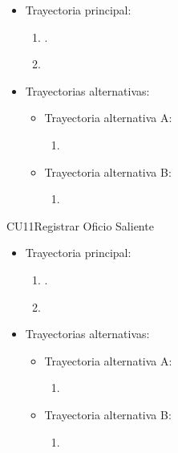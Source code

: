 \begin{itemize}	
	\item Trayectoria principal:
		\begin{enumerate}
			\item {}.
			\item 
		\end{enumerate}
	\item Trayectorias alternativas:
		\begin{itemize}
			\item Trayectoria alternativa A: 
				\begin{enumerate}
					\item 
				\end{enumerate}
			\item Trayectoria alternativa B: 
				\begin{enumerate}
					\item 
				\end{enumerate}
		\end{itemize}
\end{itemize}

\newpage
\begin{UseCase}{CU11}{Registrar Oficio Saliente}{}
	\UCitem{}{}
\end{UseCase}

\begin{itemize}	
	\item Trayectoria principal:
		\begin{enumerate}
			\item {}.
			\item 
		\end{enumerate}
	\item Trayectorias alternativas:
		\begin{itemize}
			\item Trayectoria alternativa A: 
				\begin{enumerate}
					\item 
				\end{enumerate}
			\item Trayectoria alternativa B: 
				\begin{enumerate}
					\item 
				\end{enumerate}
		\end{itemize}
\end{itemize}

\newpage